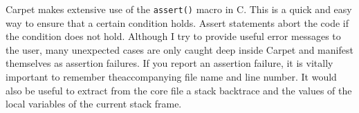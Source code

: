 \documentclass{article}
\begin{document}
   Carpet makes extensive use of the \texttt{assert()} macro in C.
   This is a quick and easy way to ensure that a certain condition
   holds.  Assert statements abort the code if the condition does not
   hold.  Although I try to provide useful error messages to the user,
   many unexpected cases are only caught deep inside Carpet and
   manifest themselves as assertion failures.  If you report an
   assertion failure, it is vitally important to remember
   theaccompanying file name and line number.  It would also be useful
   to extract from the core file a stack backtrace and the values of
   the local variables of the current stack frame.
\end{document}
